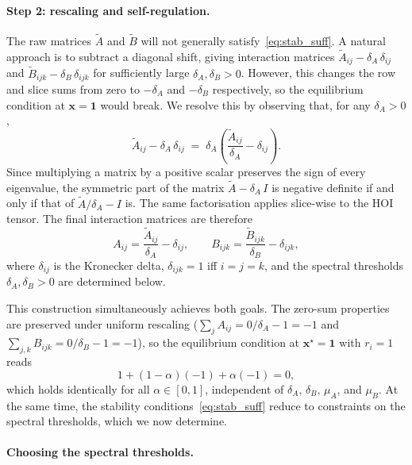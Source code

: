 \documentclass[pdflatex,sn-mathphys-num]{sn-jnl}%
\newcommand{\bone}{\mathbf{1}}
\newcommand{\bx}{\mathbf{x}}
\begin{document}
\paragraph{Step 2: rescaling and self-regulation.} The raw matrices $\tilde{A}$ and $\tilde{B}$ will not generally satisfy~\eqref{eq:stab_suff}. A natural approach is to subtract a diagonal shift, giving interaction matrices $\tilde{A}_{ij} - \delta_A\,\delta_{ij}$ and $\tilde{B}_{ijk} - \delta_B\,\delta_{ijk}$ for sufficiently large $\delta_A, \delta_B > 0$. However, this changes the row and slice sums from zero to $-\delta_A$ and $-\delta_B$ respectively, so the equilibrium condition at $\bx = \bone$ would break. We resolve this by observing that, for any $\delta_A > 0$,
\begin{equation}\label{eq:factor}
\tilde{A}_{ij} - \delta_A\,\delta_{ij}
 \;=\; \delta_A\!\left(\frac{\tilde{A}_{ij}}{\delta_A} - \delta_{ij}\right).
\end{equation}
Since multiplying a matrix by a positive scalar preserves the sign of every eigenvalue, the symmetric part of the matrix $\tilde{A} - \delta_A\,I$ is negative definite if and only if that of $\tilde{A}/\delta_A - I$ is. The same factorisation applies slice-wise to the HOI tensor. The final interaction matrices are therefore
\begin{equation}\label{eq:final_baseline}
A_{ij} = \frac{\tilde{A}_{ij}}{\delta_A} - \delta_{ij}, \qquad
B_{ijk} = \frac{\tilde{B}_{ijk}}{\delta_B} - \delta_{ijk},
\end{equation}
where $\delta_{ij}$ is the Kronecker delta, $\delta_{ijk} = 1$ iff $i = j = k$, and the spectral thresholds $\delta_A, \delta_B > 0$ are determined below.

This construction simultaneously achieves both goals. The zero-sum properties are preserved under uniform rescaling ($\sum_j A_{ij} = 0/\delta_A - 1 = -1$ and $\sum_{j,k} B_{ijk} = 0/\delta_B - 1 = -1$), so the equilibrium condition at $\bx^\star = \bone$ with $r_i = 1$ reads
\[
1 + (1-\alpha)(-1) + \alpha(-1) = 0,
\]
which holds identically for all $\alpha \in [0,1]$, independent of $\delta_A$, $\delta_B$, $\mu_A$, and $\mu_B$. At the same time, the stability conditions~\eqref{eq:stab_suff} reduce to constraints on the spectral thresholds, which we now determine.

\paragraph{Choosing the spectral thresholds.}
\end{document}
